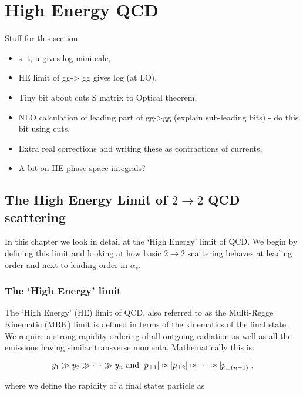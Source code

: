 \chapter{High Energy QCD}
\label{chap:HEQCD}

{\color{red}
Stuff for this section
\begin{itemize}
	\item s, t, u gives log mini-calc,
	\item HE limit of gg-> gg gives log (at LO),
	\item Tiny bit about cuts S matrix to Optical theorem,
	\item NLO calculation of leading part of gg->gg (explain sub-leading bits) - do this bit using cuts,
	\item Extra real corrections and writing these as contractions of currents,
	\item A bit on HE phase-space integrals?
\end{itemize}
}

\section{The High Energy Limit of $2\rightarrow2$ QCD scattering}

	In this chapter we look in detail at the `High Energy' limit of QCD.  We begin by defining this limit and
	looking at how basic $2\rightarrow2$ scattering behaves at leading order and next-to-leading order in
	$\alpha_s$.

	\subsection{The `High Energy' limit}
		\label{sub:HElimit}

		The `High Energy' (HE) limit of QCD, also referred to as the Multi-Regge Kinematic (MRK) limit is
		defined in terms of the kinematics of the final state.  We require a strong rapidity ordering
		of all outgoing radiation as well as all the emissions having similar transverse momenta.
		Mathematically this is:

		\begin{equation}
			y_1\gg y_2\gg\cdots\gg\\y_n \text{ and } |p_{\perp1}| \approx |p_{\perp2}| \approx\cdots\approx|p_{\perp(n-1)}|,
			\label{eqn:MRK}
		\end{equation}

  		where we define the rapidity of a final states particle as

